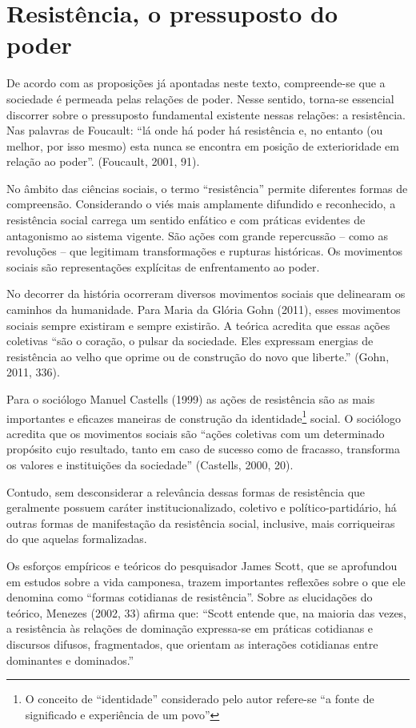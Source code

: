 \section{Resistência, o pressuposto do poder}

De acordo com as proposições já apontadas neste texto, compreende-se que
a sociedade é permeada pelas relações de poder. Nesse sentido, torna-se
essencial discorrer sobre o pressuposto fundamental existente nessas
relações: a resistência. Nas palavras de Foucault: ``lá onde há poder há
resistência e, no entanto (ou melhor, por isso mesmo) esta nunca se
encontra em posição de exterioridade em relação ao poder''. (Foucault,
2001, 91).

No âmbito das ciências sociais, o termo ``resistência'' permite
diferentes formas de compreensão. Considerando o viés mais amplamente
difundido e reconhecido, a resistência social carrega um sentido
enfático e com práticas evidentes de antagonismo ao sistema vigente. São
ações com grande repercussão -- como as revoluções -- que legitimam
transformações e rupturas históricas. Os movimentos sociais são
representações explícitas de enfrentamento ao poder.

No decorrer da história ocorreram diversos movimentos sociais que
delinearam os caminhos da humanidade. Para Maria da Glória Gohn (2011),
esses movimentos sociais sempre existiram e sempre existirão. A teórica
acredita que essas ações coletivas ``são o coração, o pulsar da
sociedade. Eles expressam energias de resistência ao velho que oprime ou
de construção do novo que liberte.'' (Gohn, 2011, 336).

Para o sociólogo Manuel Castells (1999) as ações de resistência são as
mais importantes e eficazes maneiras de construção da
identidade\footnote{O conceito de ``identidade'' considerado pelo autor
  refere-se ``a fonte de significado e experiência de um povo''} social.
O sociólogo acredita que os movimentos sociais são ``ações coletivas com
um determinado propósito cujo resultado, tanto em caso de sucesso como
de fracasso, transforma os valores e instituições da sociedade''
(Castells, 2000, 20).

Contudo, sem desconsiderar a relevância dessas formas de resistência que
geralmente possuem caráter institucionalizado, coletivo e
político-partidário, há outras formas de manifestação da resistência
social, inclusive, mais corriqueiras do que aquelas formalizadas.

Os esforços empíricos e teóricos do pesquisador James Scott, que se
aprofundou em estudos sobre a vida camponesa, trazem importantes
reflexões sobre o que ele denomina como ``formas cotidianas de
resistência''. Sobre as elucidações do teórico, Menezes (2002, 33)
afirma que: ``Scott entende que, na maioria das vezes, a resistência às
relações de dominação expressa-se em práticas cotidianas e discursos
difusos, fragmentados, que orientam as interações cotidianas entre
dominantes e dominados.''

